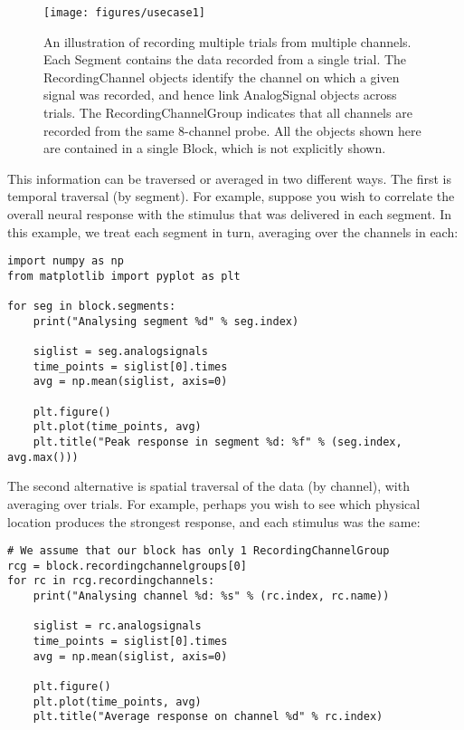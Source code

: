 \documentclass{frontiers}
\begin{document}
\begin{figure}
\centering
\texttt{[image: figures/usecase1]}
\caption{An illustration of recording multiple trials from multiple channels.  Each Segment contains the data recorded from a single trial. The RecordingChannel objects identify the channel on which a given signal was recorded, and hence link AnalogSignal objects across trials. The RecordingChannelGroup indicates that all channels are recorded from the same 8-channel probe. All the objects shown here are contained in a single Block, which is not explicitly shown.}\label{fig:usecase1} 
\end{figure}

This information can be traversed or averaged in two different ways. The first is temporal traversal (by segment). For example, suppose you wish to correlate the overall neural response with the stimulus that was delivered in each segment. In this example, we treat each segment in turn, averaging over the channels in each:

\begin{lstlisting}[style=display]
import numpy as np
from matplotlib import pyplot as plt

for seg in block.segments:
    print("Analysing segment %d" % seg.index)

    siglist = seg.analogsignals
    time_points = siglist[0].times
    avg = np.mean(siglist, axis=0)

    plt.figure()
    plt.plot(time_points, avg)
    plt.title("Peak response in segment %d: %f" % (seg.index, avg.max()))
\end{lstlisting}

The second alternative is spatial traversal of the data (by channel), with averaging over trials. For example, perhaps you wish to see which physical location produces the strongest response, and each stimulus was the same:

\begin{lstlisting}[style=display]
# We assume that our block has only 1 RecordingChannelGroup
rcg = block.recordingchannelgroups[0]
for rc in rcg.recordingchannels:
    print("Analysing channel %d: %s" % (rc.index, rc.name))

    siglist = rc.analogsignals
    time_points = siglist[0].times
    avg = np.mean(siglist, axis=0)

    plt.figure()
    plt.plot(time_points, avg)
    plt.title("Average response on channel %d" % rc.index)
\end{lstlisting}
\end{document}
